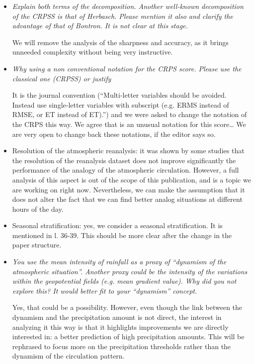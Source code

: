 \documentclass[]{letter}
\begin{document}
\begin{itemize}
	\item \textit{Explain both terms of the decomposition. Another well-known decomposition of the CRPSS is that of Herbasch. Please mention it also and clarify the advantage of that of Bontron. It is not clear at this stage.}
	
	We will remove the analysis of the sharpness and accuracy, as it brings unneeded complexity without being very instructive.
	
	\item \textit{Why using a non conventional notation for the CRPS score. Please use the classical one (CRPSS) or justify}
	
	It is the journal convention (“Multi-letter variables should be avoided. Instead use single-letter variables with subscript (e.g. ERMS instead of RMSE, or ET instead of ET).”) and we were asked to change the notation of the CRPS this way. We agree that is an unusual notation for this score… We are very open to change back these notations, if the editor says so.
	
	\item Resolution of the atmospheric reanalysis: it was shown by some studies that the resolution of the reanalysis dataset does not improve significantly the performance of the analogy of the atmospheric circulation. However, a full analysis of this aspect is out of the scope of this publication, and is a topic we are working on right now. Nevertheless, we can make the assumption that it does not alter the fact that we can find better analog situations at different hours of the day.
	
	\item Seasonal stratification: yes, we consider a seasonal stratification. It is mentioned in l. 36-39. This should be more clear after the change in the paper structure.
	
	\item \textit{You use the mean intensity of rainfall as a proxy of “dynamism of the atmospheric situation”. Another proxy could be the intensity of the variations within the geopotential fields (e.g. mean gradient value). Why did you not explore this? It would better fit to your “dynamism” concept.}
	
	Yes, that could be a possibility. However, even though the link between the dynamism and the precipitation amount is not direct, the interest in analyzing it this way is that it highlights improvements we are directly interested in: a better prediction of high precipitation amounts. This will be rephrased to focus more on the precipitation thresholds rather than the dynamism of the circulation pattern.
	

\end{itemize}
\end{document}
